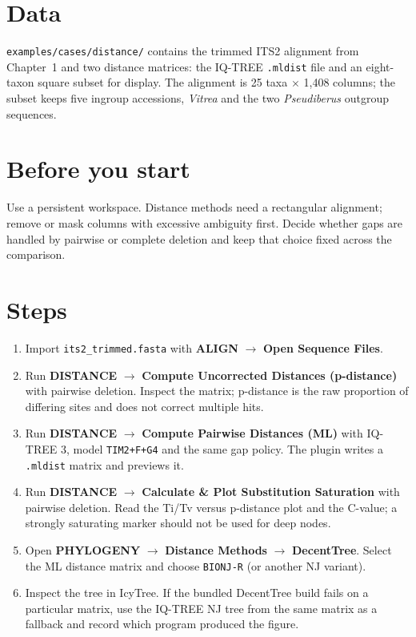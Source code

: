 \documentclass[11pt]{report}
\begin{document}
\section{Data}
\texttt{examples/cases/distance/} contains the trimmed ITS2 alignment from
Chapter~1 and two distance matrices: the IQ-TREE \texttt{.mldist} file and an
eight-taxon square subset for display. The alignment is 25 taxa $\times$ 1,408
columns; the subset keeps five ingroup accessions, \textit{Vitrea} and the two
\textit{Pseudiberus} outgroup sequences.

\section{Before you start}
Use a persistent workspace. Distance methods need a rectangular alignment;
remove or mask columns with excessive ambiguity first. Decide whether gaps
are handled by pairwise or complete deletion and keep that choice fixed across
the comparison.

\section{Steps}
\begin{enumerate}
  \item Import \texttt{its2\_trimmed.fasta} with \textbf{ALIGN} $\rightarrow$
  \textbf{Open Sequence Files}.
  \item Run \textbf{DISTANCE} $\rightarrow$ \textbf{Compute Uncorrected
  Distances (p-distance)} with pairwise deletion. Inspect the matrix; p-distance
  is the raw proportion of differing sites and does not correct multiple hits.
  \item Run \textbf{DISTANCE} $\rightarrow$ \textbf{Compute Pairwise
  Distances (ML)} with IQ-TREE 3, model \texttt{TIM2+F+G4} and the same gap
  policy. The plugin writes a \texttt{.mldist} matrix and previews it.
  \item Run \textbf{DISTANCE} $\rightarrow$ \textbf{Calculate \& Plot
  Substitution Saturation} with pairwise deletion. Read the Ti/Tv versus
  p-distance plot and the C-value; a strongly saturating marker should not be
  used for deep nodes.
  \item Open \textbf{PHYLOGENY} $\rightarrow$ \textbf{Distance Methods}
  $\rightarrow$ \textbf{DecentTree}. Select the ML distance matrix and choose
  \texttt{BIONJ-R} (or another NJ variant).
  \item Inspect the tree in IcyTree. If the bundled DecentTree build fails on
  a particular matrix, use the IQ-TREE NJ tree from the same matrix as a
  fallback and record which program produced the figure.
\end{enumerate}
\end{document}
